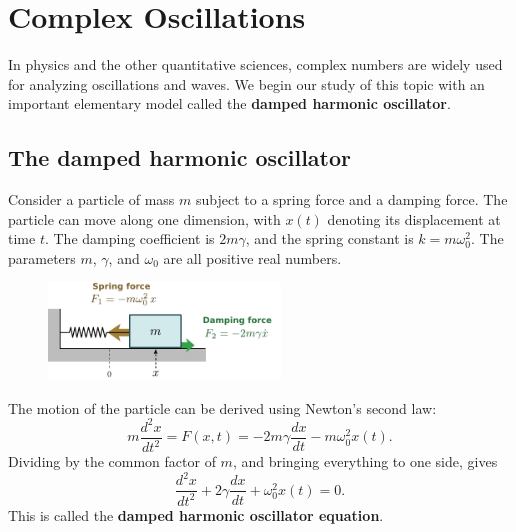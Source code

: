 \documentclass[10pt,a4paper]{article}
\begin{document}
\setcounter{page}{30}

\section{Complex Oscillations}
\label{complex-oscillations}

In physics and the other quantitative sciences, complex numbers are
widely used for analyzing oscillations and waves. We begin our study
of this topic with an important elementary model called the
\textbf{damped harmonic oscillator}.

\subsection{The damped harmonic oscillator}
\label{the-damped-harmonic-oscillator}

Consider a particle of mass $m$ subject to a spring force and a
damping force. The particle can move along one dimension, with $x(t)$
denoting its displacement at time $t$. The damping coefficient is $2m
\gamma$, and the spring constant is $k = m\omega_0^2$. The parameters
$m$, $\gamma$, and $\omega_0$ are all positive real numbers.

\begin{figure}[ht]
  \centering\includegraphics[width=0.55\textwidth]{oscillator}
\end{figure}

The motion of the particle can be derived using Newton's second law:
\begin{equation}
  m \frac{d^2 x}{dt^2} = F(x,t) = - 2m\gamma \frac{dx}{dt} - m\omega_0^2 x(t).
\end{equation}
Dividing by the common factor of $m$, and bringing everything to one
side, gives
\begin{equation}
  \frac{d^2 x}{dt^2} + 2\gamma \frac{dx}{dt} + \omega_0^2 x(t) = 0.
\end{equation}
This is called the \textbf{damped harmonic oscillator equation}.
\end{document}
